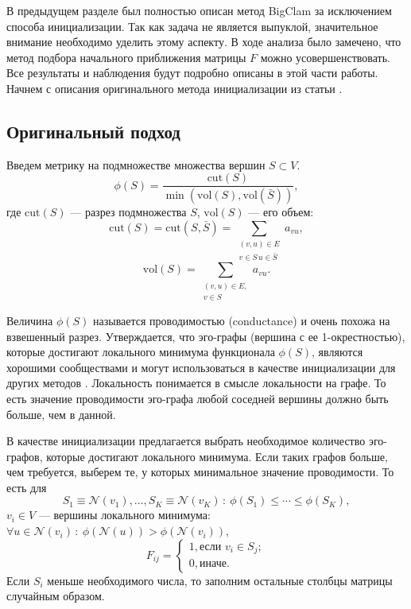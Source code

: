 \documentclass{ITaSconf}
\begin{document}
	В предыдущем разделе был полностью описан метод BigClam за исключением способа инициализации.
	Так как задача не является выпуклой, значительное внимание необходимо уделить этому аспекту.
	В ходе анализа было замечено, что метод подбора начального приближения матрицы $F$ можно усовершенствовать.
	Все результаты и наблюдения будут подробно описаны в этой части работы.
	Начнем с описания оригинального метода инициализации из статьи \cite{gleich2011neighborhoods}.
	
	\subsection{Оригинальный подход}
	
	Введем метрику на подмножестве множества вершин $ S \subset V $.
	$$\phi(S) = \dfrac{\mathrm{cut}(S)}{\min(\mathrm{vol}(S), \mathrm{vol}( \bar S))},$$
	где $\mathrm{cut}(S)$ --- разрез подмножества $S$, $\mathrm{vol}(S)$ --- его объем:
	$$\mathrm{cut}(S) = \mathrm{cut}(S, \bar S)=\sum_{\substack{(v,u)\in E\\ v \in S \, u \in \bar S}} a_{vu},$$
	$$\mathrm{vol}(S) =\sum_{\substack{(v,u)\in E,\\ v \in S}} a_{vu}.$$
	
	Величина $\phi(S)$ называется проводимостью (conductance) и очень похожа на взвешенный разрез.
	Утверждается, что эго-графы (вершина с ее 1-окрестностью), которые достигают локального минимума функционала $\phi(S)$, являются хорошими сообществами и могут использоваться в качестве инициализации для других методов \cite{gleich2011neighborhoods}.
	Локальность понимается в смысле локальности на графе.
	То есть значение проводимости эго-графа любой соседней вершины должно быть больше, чем в данной.
	
	В качестве инициализации предлагается выбрать необходимое количество эго-графов, которые достигают локального минимума.
	Если таких графов больше, чем требуется, выберем те, у которых минимальное значение проводимости.
	То есть для 
	$$S_1 \equiv \mathcal{N}(v_1), \dots, S_K \equiv \mathcal{N}(v_K)\,:\:\phi(S_1) \le \cdots \le \phi(S_K),$$
	$v_i \in V$ --- вершины локального минимума: $\forall u \in \mathcal{N}(v_i) \, : \: \phi(\mathcal{N}(u)) > \phi(\mathcal{N}(v_i))$,
	$$ 
	F_{ij}=	
	\begin{cases} 	1, \text{если } v_i \in S_j;\\
	0, \text{иначе.} 
	\end{cases}
	$$
	Если $S_i$ меньше необходимого числа, то заполним остальные столбцы матрицы случайным образом.
	
\end{document}
